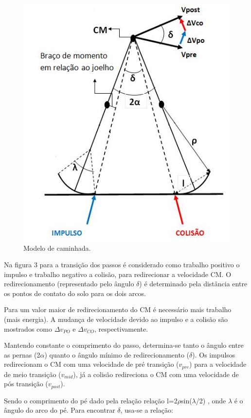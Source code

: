 \begin{figure}[!htb]
\centering
\includegraphics{centromassa}
\caption{ Modelo de caminhada.}
\label{Rotulo}
\end{figure}


Na figura 3 para a transição dos passos é considerado como trabalho positivo o impulso e trabalho negativo a colisão, para redirecionar a velocidade CM. O redirecionamento (representado pelo ângulo $\delta$) é determinado pela distância entre os pontos de contato do solo para os dois arcos.

Para um valor maior de redirecionamento do CM é necessário mais trabalho (mais energia). A mudança de velocidade devido ao impulso e a colisão são mostrados como  $\Delta v_{PO}$ e $\Delta v_{CO}$, respectivamente. 

Mantendo constante o comprimento do  passo, determina-se tanto o ângulo entre as pernas (2$\alpha$) quanto o ângulo mínimo  de redirecionamento ($\delta$). Os impulsos redirecionam o CM com uma  velocidade de pré transição ($ v_{pre}$) para a velocidade de meio transição ($v_{mid}$), já a colisão redireciona o CM com uma velocidade de pós transição ($v_{post}$). 

Sendo o comprimento do pé dado pela relação relação l=2$\rho$sin($\lambda$/2) , onde $\lambda$ é o ângulo do arco do pé. Para encontrar  $\delta$, usa-se a relação:

